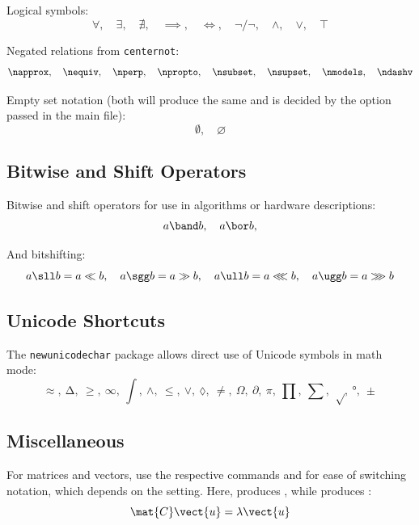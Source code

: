 Logical symbols:
\begin{equation*}
    \forall,
    \quad \exists,
    \quad \nexists,
    \quad \implies,
    \quad \iff,
    \quad \neg/\lnot,
    \quad \land,
    \quad \lor,
    \quad \top
\end{equation*}

Negated relations from \texttt{centernot}:
\begin{equation*}
    \napprox,
    \quad \nequiv,
    \quad \nperp,
    \quad \npropto,
    \quad \nsubset,
    \quad \nsupset,
    \quad \nmodels,
    \quad \ndashv
\end{equation*}

Empty set notation (both will produce the same and is decided by the option passed in the main file):
\begin{equation*}
    \emptyset,
    \quad \varnothing
\end{equation*}

\subsection{Bitwise and Shift Operators}

Bitwise and shift operators for use in algorithms or hardware descriptions:
\begin{equation*}
    a \band b,
    \quad a \bor b,
\end{equation*}

And bitshifting:
\begin{equation*}
    a \sll b = a \ll b,
    \quad a \sgg b = a \gg b,
    \quad a \ull b = a \lll b,
    \quad a \ugg b = a \ggg b
\end{equation*}

\subsection{Unicode Shortcuts}

The \texttt{newunicodechar} package allows direct use of Unicode symbols in math mode:
\begin{equation*}
    ≈,\ ∆,\ ≥,\ ∞,\ ∫,\ ∧,\ ≤,\ ∨,\ ◊,\ ≠,\ Ω,\ ∂,\ π,\ ∏,\ ∑,\ √,\ °,\ ±
\end{equation*}

\subsection{Miscellaneous}

For matrices and vectors, use the respective commands \texttt{\mat} and \texttt{\vect} for ease of switching notation, which depends on the setting. Here, \texttt{\mat} produces \texttt{\mathbf}, while \texttt{\vect} produces \texttt{\bm}:
\begin{equation*}
    \mat{C}\vect{u} = \lambda \vect{u}
\end{equation*}

